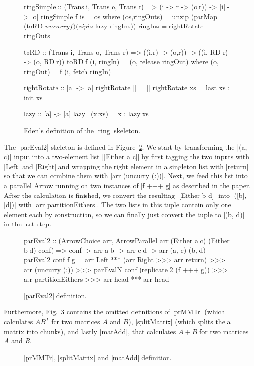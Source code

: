 \begin{figure}[h]
\begin{code}
ringSimple :: (Trans i, Trans o, Trans r) => (i -> r -> (o,r)) -> [i] -> [o]
ringSimple f is =  os
  where (os,ringOuts) = unzip (parMap (toRD $ uncurry f) (zip is $ lazy ringIns))
        ringIns = rightRotate ringOuts

toRD :: (Trans i, Trans o, Trans r) => ((i,r) -> (o,r)) -> ((i, RD r) -> (o, RD r))
toRD  f (i, ringIn)  = (o, release ringOut)
  where (o, ringOut) = f (i, fetch ringIn)

rightRotate    :: [a] -> [a]
rightRotate [] =  []
rightRotate xs =  last xs : init xs

lazy :: [a] -> [a]
lazy ~(x:xs) = x : lazy xs
\end{code}
\caption{Eden's definition of the |ring| skeleton.}
\label{fig:ringEden}
\end{figure}

The |parEval2| skeleton is defined in Figure~\ref{fig:parEval2}. 
We start by transforming the |(a, c)| input into a two-element list |[Either a c]| by first tagging the two inputs with |Left| and |Right| and wrapping the right element in a singleton list with |return| so that we can combine them with |arr (uncurry (:))|. Next, we feed this list into a parallel Arrow running on two instances of |f +++ g| as described in the paper. After the calculation is finished, we convert the resulting |[Either b d]| into |([b], [d])| with |arr partitionEithers|. The two lists in this tuple contain only one element each by construction, so we can finally just convert the tuple to |(b, d)| in the last step.
\begin{figure}[h]
\begin{code}
parEval2 :: (ArrowChoice arr,
	ArrowParallel arr (Either a c) (Either b d) conf) =>
	conf -> arr a b -> arr c d -> arr (a, c) (b, d)
parEval2 conf f g =
	arr Left *** (arr Right >>> arr return) >>>
	arr (uncurry (:)) >>>
	parEvalN conf (replicate 2 (f +++ g)) >>>
	arr partitionEithers >>>
	arr head *** arr head
\end{code}
	\caption{|parEval2| definition.}
	\label{fig:parEval2}
\end{figure}
Furthermore, Fig.~\ref{fig:torus_example_rest} contains the omitted definitions of |prMMTr| (which calculates $AB^T$ for two matrices $A$ and $B$), |splitMatrix| (which splits the a matrix into chunks), and lastly |matAdd|, that calculates $A + B$ for two matrices $A$ and $B$.
\begin{figure}[h]
	\caption{|prMMTr|, |splitMatrix| and |matAdd| definition.}
	\label{fig:torus_example_rest}
\end{figure}

